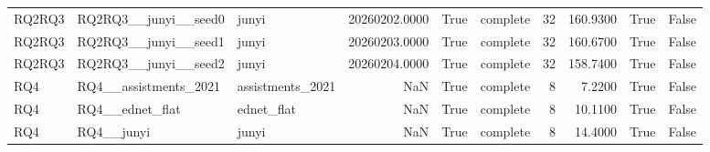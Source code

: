 \begin{tabular}{lllrrlrrrr}
RQ2RQ3 & RQ2RQ3\_\_junyi\_\_seed0 & junyi & 20260202.0000 & True & complete & 32 & 160.9300 & True & False \\
RQ2RQ3 & RQ2RQ3\_\_junyi\_\_seed1 & junyi & 20260203.0000 & True & complete & 32 & 160.6700 & True & False \\
RQ2RQ3 & RQ2RQ3\_\_junyi\_\_seed2 & junyi & 20260204.0000 & True & complete & 32 & 158.7400 & True & False \\
RQ4 & RQ4\_\_assistments\_2021 & assistments\_2021 & NaN & True & complete & 8 & 7.2200 & True & False \\
RQ4 & RQ4\_\_ednet\_flat & ednet\_flat & NaN & True & complete & 8 & 10.1100 & True & False \\
RQ4 & RQ4\_\_junyi & junyi & NaN & True & complete & 8 & 14.4000 & True & False \\
\bottomrule
\end{tabular}

